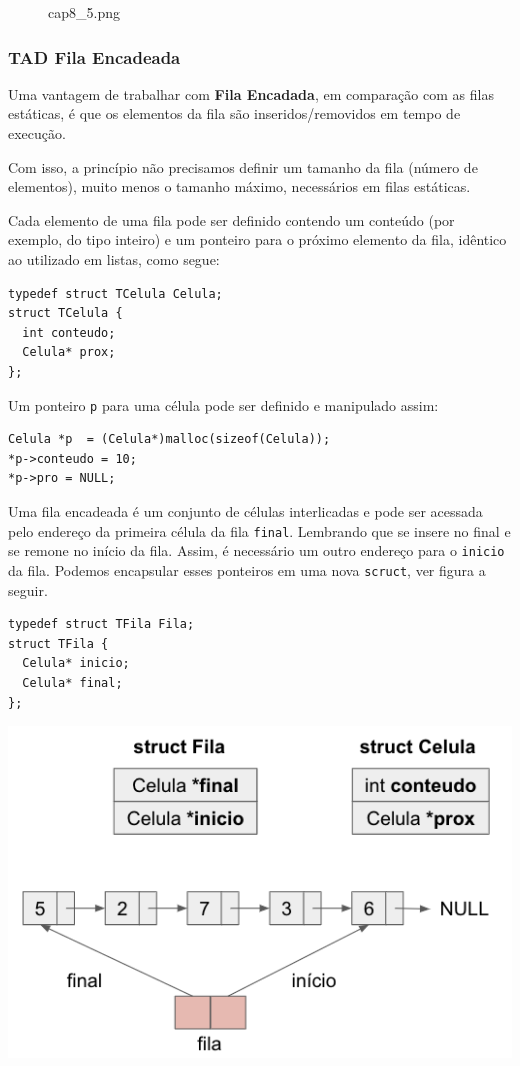 \documentclass[12pt,a4paper]{article}
\begin{document}
    \begin{figure}
\centering
\caption{cap8\_5.png}
\end{figure}

    \hypertarget{tad-fila-encadeada}{%
\subsubsection{TAD Fila Encadeada}\label{tad-fila-encadeada}}

    Uma vantagem de trabalhar com \textbf{Fila Encadada}, em comparação com
as filas estáticas, é que os elementos da fila são inseridos/removidos
em tempo de execução.

Com isso, a princípio não precisamos definir um tamanho da fila (número
de elementos), muito menos o tamanho máximo, necessários em filas
estáticas.

Cada elemento de uma fila pode ser definido contendo um conteúdo (por
exemplo, do tipo inteiro) e um ponteiro para o próximo elemento da fila,
idêntico ao utilizado em listas, como segue:

\begin{verbatim}
typedef struct TCelula Celula;
struct TCelula {
  int conteudo;
  Celula* prox;
};
\end{verbatim}

Um ponteiro \texttt{p} para uma célula pode ser definido e manipulado
assim:

\begin{verbatim}
Celula *p  = (Celula*)malloc(sizeof(Celula));
*p->conteudo = 10;
*p->pro = NULL;
\end{verbatim}

Uma fila encadeada é um conjunto de células interlicadas e pode ser
acessada pelo endereço da primeira célula da fila \texttt{final}.
Lembrando que se insere no final e se remone no início da fila. Assim, é
necessário um outro endereço para o \texttt{inicio} da fila. Podemos
encapsular esses ponteiros em uma nova \texttt{scruct}, ver figura a
seguir.

    \begin{verbatim}
typedef struct TFila Fila;
struct TFila {
  Celula* inicio;
  Celula* final;
};
\end{verbatim}

\includegraphics{"figs/cap8_6.png"}
\end{document}
